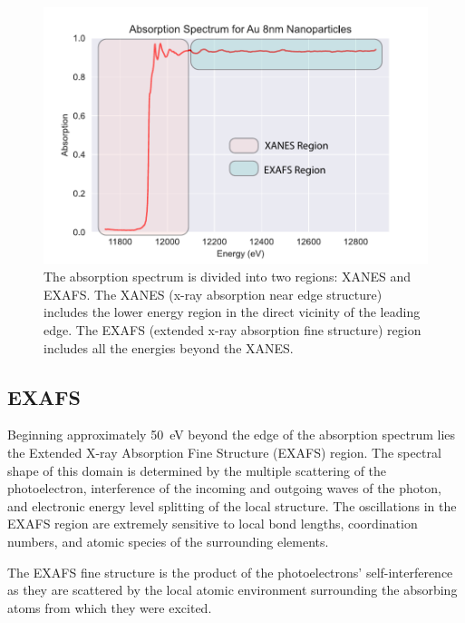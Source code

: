 \begin{figure}
    \centering
    \includegraphics[width=.75\linewidth]{Chapters/Figures/absorption-spectra-example.pdf}
    \caption{The absorption spectrum is divided into two regions: XANES and EXAFS. The XANES (x-ray absorption near edge structure) includes the lower energy region in the direct vicinity of the leading edge. The EXAFS (extended x-ray absorption fine structure) region includes all the energies beyond the XANES.}
    \label{XAFS-example-spectrum}
\end{figure}

\subsection{EXAFS}
Beginning approximately 50~eV beyond the edge of the absorption spectrum lies the Extended X-ray Absorption Fine Structure (EXAFS) region. The spectral shape of this domain is determined by the multiple scattering of the photoelectron, interference of the incoming and outgoing waves of the photon, and electronic energy level splitting of the local structure. The oscillations in the EXAFS region are extremely sensitive to local bond lengths, coordination numbers, and atomic species of the surrounding elements.

The EXAFS fine structure is the product of the photoelectrons' self-interference as they are scattered by the local atomic environment surrounding the absorbing atoms from which they were excited.

